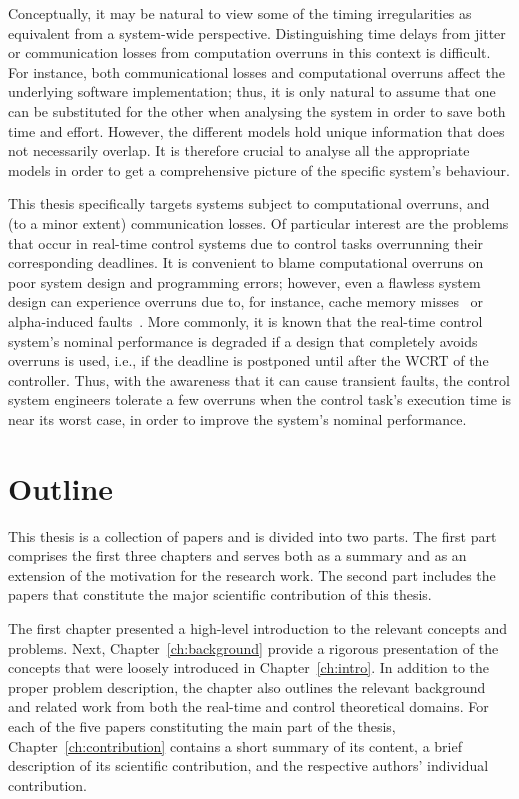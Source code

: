 %
Conceptually, it may be natural to view some of the timing irregularities as equivalent from a system-wide perspective.
Distinguishing time delays from jitter or communication losses from computation overruns in this context is difficult.
For instance, both communicational losses and computational overruns affect the underlying software implementation; thus, it is only natural to assume that one can be substituted for the other when analysing the system in order to save both time and effort.
However, the different models hold unique information that does not necessarily overlap.
It is therefore crucial to analyse all the appropriate models in order to get a comprehensive picture of the specific system's behaviour.

This thesis specifically targets systems subject to computational overruns, and (to a minor extent) communication losses.
Of particular interest are the problems that occur in real-time control systems due to control tasks overrunning their corresponding deadlines.
It is convenient to blame computational overruns on poor system design and programming errors; however, even a flawless system design can experience overruns due to, for instance, cache memory misses~\addref{} or alpha-induced faults~\addref{}.
More commonly, it is known that the real-time control system's nominal performance is degraded if a design that completely avoids overruns is used, i.e., if the deadline is postponed until after the WCRT of the controller.
Thus, with the awareness that it can cause transient faults, the control system engineers tolerate a few overruns when the control task's execution time is near its worst case, in order to improve the system's nominal performance.



\section{Outline}%
\label{sec:intro:outline}%
%
This thesis is a collection of papers and is divided into two parts.
The first part comprises the first three chapters and serves both as a summary and as an extension of the motivation for the research work.
The second part includes the papers that constitute the major scientific contribution of this thesis.

The first chapter presented a high-level introduction to the relevant concepts and problems.
Next, Chapter~\ref{ch:background} provide a rigorous presentation of the concepts that were loosely introduced in Chapter~\ref{ch:intro}.
In addition to the proper problem description, the chapter also outlines the relevant background and related work from both the real-time and control theoretical domains.
For each of the five papers constituting the main part of the thesis, Chapter~\ref{ch:contribution} contains a short summary of its content, a brief description of its scientific contribution, and the respective authors' individual contribution.
